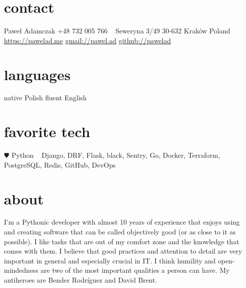 \documentclass[]{cv-style}  %
\begin{document}
\lastupdated


\begin{aside}
%
\section{contact}
Paweł Adamczak
+48 732 005 766
~
Seweryna 3/49
30-632 Kraków
Poland
~
\href{https://pawelad.me/}{https://pawelad.me}
\href{mailto:pawel.ad@gmail.com}{gmail://pawel.ad}
\href{https://www.github.com/pawelad}{github://pawelad}
%
\section{languages}
native Polish
fluent English
%
\section{favorite tech}
{\color{red} $\varheartsuit$} Python
~
Django, DRF, Flask, black, Sentry, Go, Docker, Terraform, PostgreSQL, Redis, GitHub, DevOps
\end{aside}


\section{about}
  \vspace{-0.25cm}

I'm a Pythonic developer with almost 10 years of experience that enjoys using and creating software that can be called objectively good (or as close to it as possible). I like tasks that are out of my comfort zone and the knowledge that comes with them. I believe that good practices and attention to detail are very important in general and especially crucial in IT. I think humility and open-mindedness are two of the most important qualities a person can have. My antiheroes are Bender Rodríguez and David Brent.

\vspace{-0.3cm}
\end{document}
